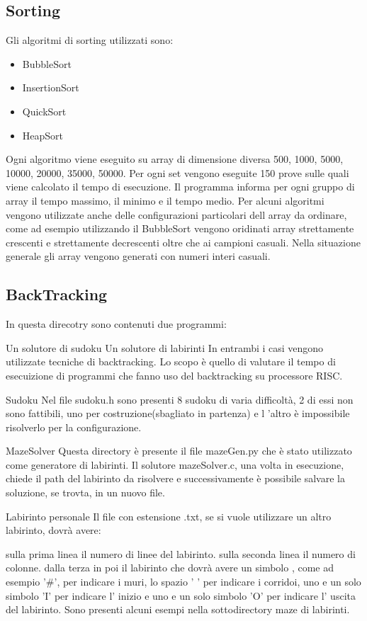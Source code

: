 \documentclass[12pt,a4paper]{report}
\begin{document}
\subsection{Sorting}
Gli algoritmi di sorting utilizzati sono:
\begin{itemize}
	\item BubbleSort
	\item InsertionSort
	\item QuickSort
	\item HeapSort
\end{itemize}

Ogni algoritmo viene eseguito su array di dimensione diversa 500, 1000, 5000, 10000, 20000, 35000, 50000. Per ogni set vengono eseguite 150 prove sulle quali viene calcolato il tempo di esecuzione. Il programma informa per ogni gruppo di array il tempo massimo, il minimo e il tempo medio. Per alcuni algoritmi vengono utilizzate anche delle configurazioni particolari dell array da ordinare, come ad esempio utilizzando il BubbleSort vengono oridinati array strettamente crescenti e strettamente decrescenti oltre che ai campioni casuali. Nella situazione generale gli array vengono generati con numeri interi casuali.

\subsection{BackTracking}

In questa direcotry sono contenuti due programmi:

Un solutore di sudoku
Un solutore di labirinti
In entrambi i casi vengono utilizzate tecniche di backtracking. Lo scopo è quello di valutare il tempo di esecuizione di programmi che fanno uso del backtracking su processore RISC.

Sudoku
Nel file sudoku.h sono presenti 8 sudoku di varia difficoltà, 2 di essi non sono fattibili, uno per costruzione(sbagliato in partenza) e l 'altro è impossibile risolverlo per la configurazione.

MazeSolver
Questa directory è presente il file mazeGen.py che è stato utilizzato come generatore di labirinti. Il solutore mazeSolver.c, una volta in esecuzione, chiede il path del labirinto da risolvere e successivamente è possibile salvare la soluzione, se trovta, in un nuovo file.

Labirinto personale
Il file con estensione .txt, se si vuole utilizzare un altro labirinto, dovrà avere:

sulla prima linea il numero di linee del labirinto.
sulla seconda linea il numero di colonne.
dalla terza in poi il labirinto che dovrà avere un simbolo , come ad esempio '\#', per indicare i muri, lo spazio ' ' per indicare i corridoi, uno e un solo simbolo 'I' per indicare l' inizio e uno e un solo simbolo 'O' per indicare l' uscita del labirinto.
Sono presenti alcuni esempi nella sottodirectory maze di labirinti.
\end{document}
